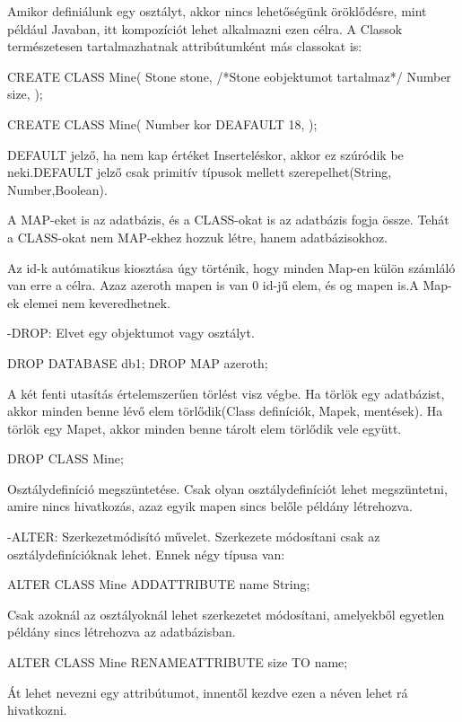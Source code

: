 \begin{sql}
Amikor definiálunk egy osztályt, akkor nincs lehetőségünk öröklődésre, mint például Javaban, itt kompozíciót lehet alkalmazni ezen célra.
A Classok természetesen tartalmazhatnak attribútumként más classokat is:

\begin{sql}
CREATE CLASS Mine(
	Stone stone,  /*Stone eobjektumot tartalmaz*/
	Number size,
);

CREATE CLASS Mine(
	Number kor DEAFAULT 18,
);
\end{sql}

DEFAULT jelző, ha nem kap értéket Inserteléskor, akkor ez szúródik be neki.DEFAULT jelző csak primitív típusok mellett szerepelhet(String, Number,Boolean).

A MAP-eket is az adatbázis, és a CLASS-okat is az adatbázis fogja össze. Tehát a CLASS-okat nem MAP-ekhez hozzuk létre, hanem adatbázisokhoz.

Az id-k autómatikus kiosztása úgy történik, hogy minden Map-en külön számláló van erre a célra. Azaz azeroth mapen is van 0 id-jű elem, és og mapen is.A Map-ek elemei nem keveredhetnek.


-DROP: Elvet egy objektumot vagy osztályt.
\begin{sql}
DROP DATABASE db1;
DROP MAP azeroth;
\end{sql}
A két fenti utasítás értelemszerűen törlést visz végbe. Ha törlök egy adatbázist, akkor minden benne lévő elem törlődik(Class definíciók, Mapek, mentések).
Ha törlök  egy Mapet, akkor minden benne tárolt elem törlődik vele együtt.

\begin{sql}
DROP CLASS Mine;
\end{sql}
Osztálydefiníció megszüntetése. Csak olyan osztálydefiníciót lehet megszüntetni, amire nincs hivatkozás, azaz egyik mapen sincs belőle példány létrehozva.

-ALTER: Szerkezetmódisító művelet. 
Szerkezete módosítani csak az osztálydefinícióknak lehet. Ennek négy típusa van:


\begin{sql}
ALTER CLASS Mine ADDATTRIBUTE name String;
\end{sql}
Csak azoknál az osztályoknál lehet szerkezetet módosítani, amelyekből egyetlen példány sincs létrehozva az adatbázisban.

\begin{sql}
ALTER CLASS Mine RENAMEATTRIBUTE size TO name;
\end{sql}
Át lehet nevezni egy attribútumot, innentől kezdve ezen a néven lehet rá hivatkozni.


\end{sql}
